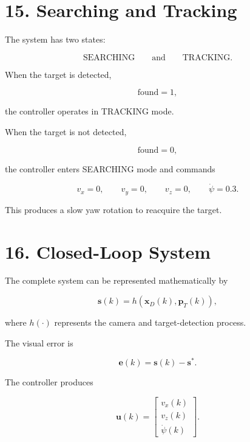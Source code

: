 \documentclass[12pt,a4paper]{article}
\begin{document}
\section{15. Searching and Tracking}

The system has two states:

\begin{equation}
\boxed{
\text{SEARCHING}
\qquad\text{and}\qquad
\text{TRACKING}.
}
\end{equation}

When the target is detected,

\begin{equation}
\text{found}=1,
\end{equation}

the controller operates in TRACKING mode.

When the target is not detected,

\begin{equation}
\text{found}=0,
\end{equation}

the controller enters SEARCHING mode and commands

\begin{equation}
\boxed{
v_x=0,\qquad
v_y=0,\qquad
v_z=0,\qquad
\dot{\psi}=0.3.
}
\end{equation}

This produces a slow yaw rotation to reacquire the target.

\section{16. Closed-Loop System}

The complete system can be represented mathematically by

\begin{equation}
\mathbf{s}(k)
=
h\left(
\mathbf{x}_D(k),
\mathbf{p}_T(k)
\right),
\end{equation}

where $h(\cdot)$ represents the camera and target-detection process.

The visual error is

\begin{equation}
\mathbf{e}(k)
=
\mathbf{s}(k)-\mathbf{s}^*.
\end{equation}

The controller produces

\begin{equation}
\mathbf{u}(k)
=
\begin{bmatrix}
v_x(k)\\
v_z(k)\\
\dot{\psi}(k)
\end{bmatrix}.
\end{equation}
\end{document}
